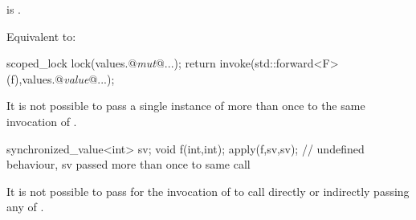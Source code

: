 \begin{itemdescr}
    

\pnum
\constraints
{} is .

\pnum
\effects
Equivalent to:

\begin{codeblock}
    scoped_lock lock(values.@\emph{mut}@...);
    return invoke(std::forward<F>(f),values.@\emph{value}@...);
\end{codeblock}

\begin{note} It is not possible to pass a single instance of 
more than once to the same invocation of .
\begin{example}

\begin{codeblock}
      synchronized_value<int> sv;
      void f(int,int);
      apply(f,sv,sv); // undefined behaviour, sv passed more than once to same call
\end{codeblock}
\end{example}
 \end{note}

\begin{note} It is not possible to pass for the invocation of  to call 
directly or indirectly passing any of . 
\end{note}
\end{itemdescr}

